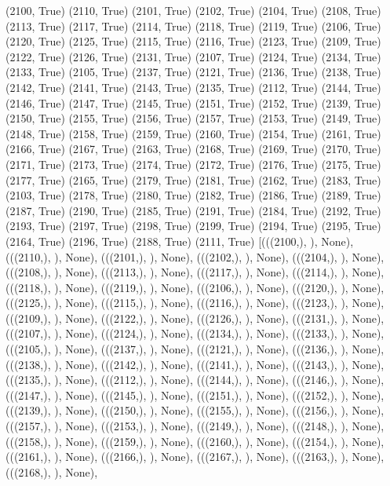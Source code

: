(2100, True)
(2110, True)
(2101, True)
(2102, True)
(2104, True)
(2108, True)
(2113, True)
(2117, True)
(2114, True)
(2118, True)
(2119, True)
(2106, True)
(2120, True)
(2125, True)
(2115, True)
(2116, True)
(2123, True)
(2109, True)
(2122, True)
(2126, True)
(2131, True)
(2107, True)
(2124, True)
(2134, True)
(2133, True)
(2105, True)
(2137, True)
(2121, True)
(2136, True)
(2138, True)
(2142, True)
(2141, True)
(2143, True)
(2135, True)
(2112, True)
(2144, True)
(2146, True)
(2147, True)
(2145, True)
(2151, True)
(2152, True)
(2139, True)
(2150, True)
(2155, True)
(2156, True)
(2157, True)
(2153, True)
(2149, True)
(2148, True)
(2158, True)
(2159, True)
(2160, True)
(2154, True)
(2161, True)
(2166, True)
(2167, True)
(2163, True)
(2168, True)
(2169, True)
(2170, True)
(2171, True)
(2173, True)
(2174, True)
(2172, True)
(2176, True)
(2175, True)
(2177, True)
(2165, True)
(2179, True)
(2181, True)
(2162, True)
(2183, True)
(2103, True)
(2178, True)
(2180, True)
(2182, True)
(2186, True)
(2189, True)
(2187, True)
(2190, True)
(2185, True)
(2191, True)
(2184, True)
(2192, True)
(2193, True)
(2197, True)
(2198, True)
(2199, True)
(2194, True)
(2195, True)
(2164, True)
(2196, True)
(2188, True)
(2111, True)
[(((2100,), {}), None),
 (((2110,), {}), None),
 (((2101,), {}), None),
 (((2102,), {}), None),
 (((2104,), {}), None),
 (((2108,), {}), None),
 (((2113,), {}), None),
 (((2117,), {}), None),
 (((2114,), {}), None),
 (((2118,), {}), None),
 (((2119,), {}), None),
 (((2106,), {}), None),
 (((2120,), {}), None),
 (((2125,), {}), None),
 (((2115,), {}), None),
 (((2116,), {}), None),
 (((2123,), {}), None),
 (((2109,), {}), None),
 (((2122,), {}), None),
 (((2126,), {}), None),
 (((2131,), {}), None),
 (((2107,), {}), None),
 (((2124,), {}), None),
 (((2134,), {}), None),
 (((2133,), {}), None),
 (((2105,), {}), None),
 (((2137,), {}), None),
 (((2121,), {}), None),
 (((2136,), {}), None),
 (((2138,), {}), None),
 (((2142,), {}), None),
 (((2141,), {}), None),
 (((2143,), {}), None),
 (((2135,), {}), None),
 (((2112,), {}), None),
 (((2144,), {}), None),
 (((2146,), {}), None),
 (((2147,), {}), None),
 (((2145,), {}), None),
 (((2151,), {}), None),
 (((2152,), {}), None),
 (((2139,), {}), None),
 (((2150,), {}), None),
 (((2155,), {}), None),
 (((2156,), {}), None),
 (((2157,), {}), None),
 (((2153,), {}), None),
 (((2149,), {}), None),
 (((2148,), {}), None),
 (((2158,), {}), None),
 (((2159,), {}), None),
 (((2160,), {}), None),
 (((2154,), {}), None),
 (((2161,), {}), None),
 (((2166,), {}), None),
 (((2167,), {}), None),
 (((2163,), {}), None),
 (((2168,), {}), None),
